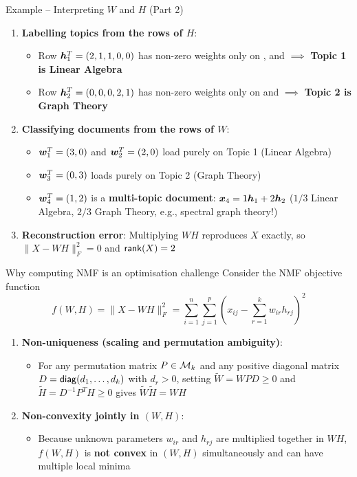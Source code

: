 \documentclass[aspectratio=169]{beamer}\usepackage[]{graphicx}\usepackage[]{xcolor}
\begin{document}
\begin{frame}{Example -- Interpreting $W$ and $H$ (Part 2)}
\begin{enumerate}
\item \textbf{Labelling topics from the rows of $H$}:
\begin{itemize}
\item Row $\bm{h}_1^T = (2, 1, 1, 0, 0)$ has non-zero weights only on ,  and  $\implies$ \textbf{Topic 1 is Linear Algebra}
\item Row $\bm{h}_2^T = (0, 0, 0, 2, 1)$ has non-zero weights only on  and  $\implies$ \textbf{Topic 2 is Graph Theory}
\end{itemize}
\vfill
\item \textbf{Classifying documents from the rows of $W$}:
\begin{itemize}
\item $\bm{w}_1^T = (3, 0)$ and $\bm{w}_2^T = (2, 0)$ load purely on Topic 1 (Linear Algebra)
\item $\bm{w}_3^T = (0, 3)$ loads purely on Topic 2 (Graph Theory)
\item $\bm{w}_4^T = (1, 2)$ is a \textbf{multi-topic document}: $\bm{x}_4 = 1\bm{h}_1 + 2\bm{h}_2$ ($1/3$ Linear Algebra, $2/3$ Graph Theory, e.g., spectral graph theory!)
\end{itemize}
\vfill
\item \textbf{Reconstruction error}: Multiplying $W H$ reproduces $X$ exactly, so $\|X - WH\|_F^2 = 0$ and $\mathsf{rank}(X) = 2$
\end{enumerate}
\end{frame}



\begin{frame}{Why computing NMF is an optimisation challenge}
Consider the NMF objective function
\[
f(W, H) = \|X - W H\|_F^2 = \sum_{i=1}^n \sum_{j=1}^p \left(x_{ij} - \sum_{r=1}^k w_{ir} h_{rj}\right)^2
\]
\vfill
\begin{enumerate}
\item \textbf{Non-uniqueness (scaling and permutation ambiguity)}:
\begin{itemize}
\item For any permutation matrix $P \in \mathcal{M}_k$ and any positive diagonal matrix $D = \mathsf{diag}(d_1, \ldots, d_k)$ with $d_r > 0$, setting $\tilde{W} = W P D \ge 0$ and $\tilde{H} = D^{-1} P^T H \ge 0$ gives $\tilde{W}\tilde{H} = W H$
\end{itemize}
\vfill
\item \textbf{Non-convexity jointly in $(W, H)$}:
\begin{itemize}
\item Because unknown parameters $w_{ir}$ and $h_{rj}$ are multiplied together in $W H$, $f(W, H)$ is \textbf{not convex} in $(W, H)$ simultaneously and can have multiple local minima
\end{itemize}
\end{enumerate}
\end{frame}
\end{document}
